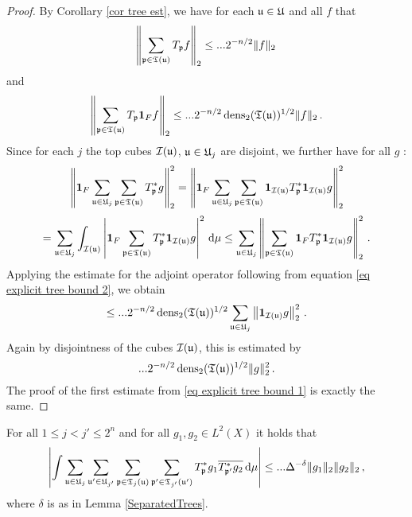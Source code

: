 \begin{proof}
    By Corollary \ref{cor tree est}, we have for each $\mathfrak u \in \mathfrak U$ and all $f$  that
    \begin{equation}
        \label{eq explicit tree bound 1}
        \left\|\sum_{\mathfrak p \in \mathfrak T(\mathfrak u)} T_{\mathfrak p} f \right\|_{2}  \le ... 2^{-n/2}  \|f\|_2\,
    \end{equation}
    and
    \begin{equation}
        \label{eq explicit tree bound 2}
        \left\|\sum_{\mathfrak p \in \mathfrak T(\mathfrak u)} T_{\mathfrak p} \mathbf{1}_F f \right\|_{2} \le ... 2^{-n/2} \operatorname{\operatorname{dens}}_2(\mathfrak T(\mathfrak u))^{1/2} \|f\|_2\,.
    \end{equation}
    Since for each $j$ the top cubes $\mathcal{I}(\mathfrak u)$, $\mathfrak u \in \mathfrak U_j$ are disjoint, we further have for all $g$ :
    $$
        \left\|\mathbf{1}_F \sum_{\mathfrak u \in \mathfrak U_j} \sum_{\mathfrak p \in \mathfrak T(\mathfrak u)} T_{\mathfrak p}^* g\right\|_2^2 = \left\|\mathbf{1}_F \sum_{\mathfrak u \in \mathfrak U_j} \sum_{\mathfrak p \in \mathfrak T(\mathfrak u)} \mathbf{1}_{\mathcal{I}(\mathfrak u)} T_{\mathfrak p}^* \mathbf{1}_{\mathcal{I}(\mathfrak u)} g\right\|_2^2
    $$
    $$
        = \sum_{\mathfrak u \in \mathfrak U_j} \int_{\mathcal{I}(\mathfrak u)} \left| \mathbf{1}_F \sum_{\mathfrak p \in \mathfrak T(\mathfrak u)} T_{\mathfrak p}^* \mathbf{1}_{\mathcal{I}(\mathfrak u)} g\right|^2 \, \mathrm{d}\mu
        \le \sum_{\mathfrak u \in \mathfrak U_j} \left\|\sum_{\mathfrak p \in \mathfrak T(\mathfrak u)} \mathbf{1}_F T_{\mathfrak p}^* \mathbf{1}_{\mathcal{I}(\mathfrak u)} g\right\|_2^2\,.
    $$
    Applying the estimate for the adjoint operator following from equation \eqref{eq explicit tree bound 2}, we obtain
    $$
        \le ...2^{-n/2} \operatorname{\operatorname{dens}}_2(\mathfrak T(\mathfrak u))^{1/2} \sum_{\mathfrak u \in \mathfrak U_j} \left\| \mathbf{1}_{\mathcal{I}(\mathfrak u)} g\right\|_2^2\,.
    $$
    Again by disjointness of the cubes $\mathcal{I}(\mathfrak u)$, this is estimated by
    $$
        ...2^{-n/2} \operatorname{\operatorname{dens}}_2(\mathfrak T(\mathfrak u))^{1/2} \|g\|_2^2\,.
    $$
    The proof of the first estimate from \eqref{eq explicit tree bound 1} is exactly the same.
\end{proof}

\begin{lemma}
    \label{lem sep row bound}
    For all $1 \le j < j' \le 2^n$ and for all $g_1, g_2 \in L^2(X)$  it holds that
    $$
        \left| \int \sum_{\mathfrak u \in \mathfrak U_j} \sum_{\mathfrak u' \in \mathfrak U_{j'}} \sum_{\mathfrak p \in \mathfrak T_j(\mathfrak u)} \sum_{\mathfrak p' \in \mathfrak T_{j'}(\mathfrak u')} T^*_{\mathfrak p} g_1 \overline{T^*_{\mathfrak p'} g_2} \, \mathrm{d}\mu \right| \le ... \Delta^{-\delta} \|g_1\|_2 \|g_2\|_2\,,
    $$
    where $\delta$ is as in Lemma \ref{SeparatedTrees}.
\end{lemma}

